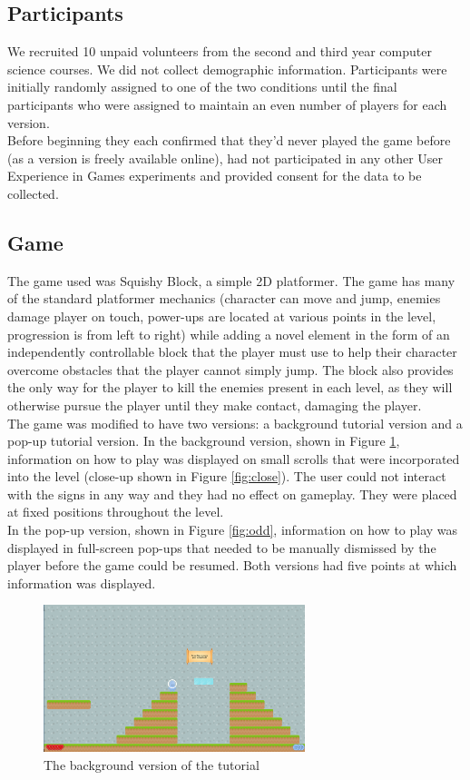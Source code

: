 \documentclass{acmsiggraph}
\begin{document}
\subsection{Participants}

We recruited 10 unpaid volunteers from the second and third year computer science courses. We did not collect demographic information. Participants were initially randomly assigned to one of the two conditions until the final participants who were assigned to maintain an even number of players for each version.\\
Before beginning they each confirmed that they'd never played the game before (as a version is freely available online)\cite{ssbb}, had not participated in any other User Experience in Games experiments and provided consent for the data to be collected.

\subsection{Game}

The game used was Squishy Block, a simple 2D platformer. The game has many of the standard platformer mechanics (character can move and jump, enemies damage player on touch, power-ups are located at various points in the level, progression is from left to right) while adding a novel element in the form of an independently controllable block that the player must use to help their character overcome obstacles that the player cannot simply jump. The block also provides the only way for the player to kill the enemies present in each level, as they will otherwise pursue the player until they make contact, damaging the player. \\
The game was modified to have two versions: a background tutorial version and a pop-up tutorial version.
In the background version, shown in Figure \ref{fig:even}, information on how to play was displayed on small scrolls that were incorporated into the level (close-up shown in Figure \ref{fig:close}). The user could not interact with the signs in any way and they had no effect on gameplay. They were placed at fixed positions throughout the level.\\ 
In the pop-up version, shown in Figure \ref{fig:odd}, information on how to play was displayed in full-screen pop-ups that needed to be manually dismissed by the player before the game could be resumed. Both versions had five points at which information was displayed. 
\begin{figure}[ht]
  \centering
  \includegraphics[width=3.0in]{images/even}
  \caption{The background version of the tutorial}
  \label{fig:even}
\end{figure}
\end{document}
